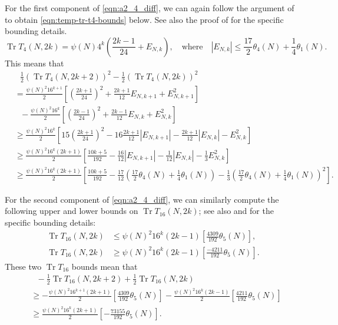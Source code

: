 \documentclass[11pt,letterpaper,reqno]{amsart}
\numberwithin{figure}{section}
\numberwithin{table}{section}
\theoremstyle{definition}
\theoremstyle{plain}
\newcommand{\lrabs}[1]{\left\lvert #1 \right\lvert}
\newcommand{\lrp}[1]{\left(#1\right)}
\newcommand{\lrb}[1]{\left[#1\right]}
\theoremstyle{definition}
\theoremstyle{definition}
\theoremstyle{remark}
\numberwithin{equation}{section}
\DeclareMathOperator{\Tr}{Tr}
\begin{document}
For the first component of \eqref{eqn:a2_4_diff}, we can again follow the argument of \cite[Proposition 4.7]{previousPaper} to obtain \eqref{eqn:temp-tr-t4-bounds} below. See also the proof of \cite[Proposition 5.5]{ross-xue} for the specific bounding details.
\begin{equation} \label{eqn:temp-tr-t4-bounds}
\Tr T_4(N, 2k) = \psi(N) 4^{k} \lrp{\frac{2k-1}{24} + E_{N,k}}, \quad \text{where} \quad \lrabs{E_{N,k}} \leq \frac{17}{2} \theta_4(N) + \frac14 \theta_1(N).
\end{equation}
This means that 
\begin{align}
    & \ \ \ \frac{1}{2}(\Tr T_4(N, 2k+2))^2 - \frac{1}{2}(\Tr T_4(N, 2k))^2 \\
    &= \frac{\psi(N)^2 16^{k+1}}{2} \lrb{ 
        \lrp{\frac{2k+1}{24}}^2 + \frac{2k+1}{12} E_{N,k+1} + E_{N,k+1}^2
    } \\
    & \ \ \ -
    \frac{\psi(N)^2 16^{k}}{2} \lrb{ 
        \lrp{\frac{2k-1}{24}}^2 + \frac{2k-1}{12} E_{N,k} + E_{N,k}^2
    } \\
    &\geq \frac{ \psi(N)^2 16^{k} }{2} \lrb{ 
        15 \lrp{\frac{2k+1}{24}}^2 - 16\frac{2k+1}{12} \lrabs{ E_{N,k+1} } - \frac{2k+1}{12} \lrabs{ E_{N,k} } - E_{N,k}^2
    } \\
    &\geq \frac{ \psi(N)^2 16^{k} (2k+1) }{2} \lrb{ 
        \frac{10k+5}{192} - \frac{16}{12} \lrabs{ E_{N,k+1} } - \frac{1}{12} \lrabs{ E_{N,k} } - \frac{1}{3} E_{N,k}^2
    } 
    \\
    &\geq \frac{ \psi(N)^2 16^{k} (2k+1) }{2} \lrb{ 
        \frac{10k+5}{192}  - \frac{17}{12} \lrp{\frac{17}{2} \theta_4(N) + \frac14 \theta_1(N)}  - \frac{1}{3} \lrp{\frac{17}{2} \theta_4(N) + \frac14 \theta_1(N)}^2
    }. \qquad \label{eqn:T4-comp1}
\end{align}


For the second component of \eqref{eqn:a2_4_diff}, we can similarly compute the following upper and lower bounds on $\Tr T_{16}(N,2k)$; see also \cite[Lemmas 6.1]{ross-xue} and \cite[Lemma 6.2]{ross-xue} for the specific bounding details:
\begin{align}
    \Tr T_{16}(N,2k) &\leq \psi(N)^2 16^k (2k-1) \lrb{\frac{4309}{192} \theta_5(N) }, \\
    \Tr T_{16}(N,2k) &\geq \psi(N)^2 16^{k} (2k-1) \lrb{\frac{-4211}{192} \theta_5(N)}.
\end{align}
These two $\Tr T_{16}$ bounds mean that
\begin{align}
    & \ \ \ -\frac{1}{2}\Tr T_{16}(N, 2k+2) + \frac{1}{2}\Tr T_{16}(N, 2k) \\
    &\geq -\frac{ \psi(N)^2 16^{k+1} (2k+1) }{2} \lrb{\frac{4309}{192} \theta_5(N) } - \frac{ \psi(N)^2 16^{k} (2k-1) }{2} \lrb{\frac{4211}{192} \theta_5(N)} \\
    &\geq \frac{ \psi(N)^2 16^{k} (2k+1) }{2} \lrb{- \frac{73155}{192} \theta_5(N)}. \label{eqn:T4-comp2}
\end{align}
\end{document}
